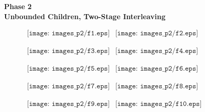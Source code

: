 \documentclass[a4paper,10pt]{article}
\begin{document}
\clearpage
\newpage

\begin{center}
\huge{\textbf{Phase 2}}  \\
\LARGE{\textbf{Unbounded Children, Two-Stage Interleaving}}
\end{center}

\begin{figure}[h]
\begin{center}$
\begin{array}{cc}
\texttt{[image: images\_p2/f1.eps]} &
\texttt{[image: images\_p2/f2.eps]}
\end{array}$
\end{center}
\end{figure}

\begin{figure}[h]
\begin{center}$
\begin{array}{cc}
\texttt{[image: images\_p2/f3.eps]} &
\texttt{[image: images\_p2/f4.eps]}
\end{array}$
\end{center}
\end{figure}

\begin{figure}[h]
\begin{center}$
\begin{array}{cc}
\texttt{[image: images\_p2/f5.eps]} &
\texttt{[image: images\_p2/f6.eps]}
\end{array}$
\end{center}
\end{figure}

\begin{figure}[h]
\begin{center}$
\begin{array}{cc}
\texttt{[image: images\_p2/f7.eps]} &
\texttt{[image: images\_p2/f8.eps]}
\end{array}$
\end{center}
\end{figure}

\begin{figure}[h]
\begin{center}$
\begin{array}{cc}
\texttt{[image: images\_p2/f9.eps]} &
\texttt{[image: images\_p2/f10.eps]}
\end{array}$
\end{center}
\end{figure}
\end{document}
